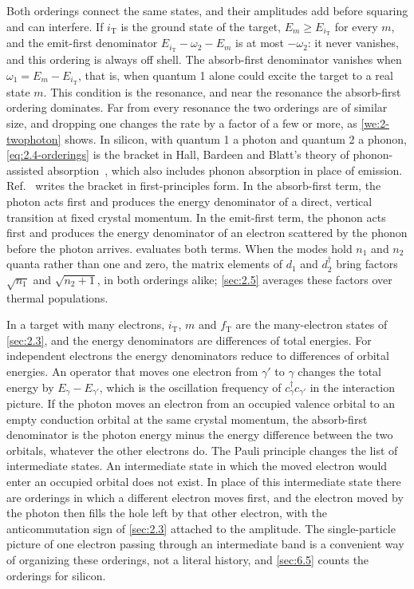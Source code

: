 Both orderings connect the same states, and their amplitudes add before squaring and can interfere. If $i_{\mathrm{T}}$ is the ground state of the target, $E_m \ge E_{i_{\mathrm{T}}}$ for every $m$, and the emit-first denominator $E_{i_{\mathrm{T}}} - \omega_2 - E_m$ is at most $-\omega_2$: it never vanishes, and this ordering is always off shell. The absorb-first denominator vanishes when $\omega_1 = E_m - E_{i_{\mathrm{T}}}$, that is, when quantum 1 alone could excite the target to a real state $m$. This condition is the resonance, and near the resonance the absorb-first ordering dominates. Far from every resonance the two orderings are of similar size, and dropping one changes the rate by a factor of a few or more, as \cref{we:2-twophoton} shows. In silicon, with quantum 1 a photon and quantum 2 a phonon, \cref{eq:2.4-orderings} is the bracket in Hall, Bardeen and Blatt's theory of phonon-assisted absorption~\cite{hall1954infrared}, which also includes phonon absorption in place of emission. Ref.~\cite[Eq.~(200)]{giustino2017electron} writes the bracket in first-principles form. In the absorb-first term, the photon acts first and produces the energy denominator of a direct, vertical transition at fixed crystal momentum. In the emit-first term, the phonon acts first and produces the energy denominator of an electron scattered by the phonon before the photon arrives.  evaluates both terms. When the modes hold $n_1$ and $n_2$ quanta rather than one and zero, the matrix elements of $d_1$ and $d_2^\dagger$ bring factors $\sqrt{n_1}$ and $\sqrt{n_2 + 1}$, in both orderings alike; \cref{sec:2.5} averages these factors over thermal populations.

In a target with many electrons, $i_{\mathrm{T}}$, $m$ and $f_{\mathrm{T}}$ are the many-electron states of \cref{sec:2.3}, and the energy denominators are differences of total energies. For independent electrons the energy denominators reduce to differences of orbital energies. An operator that moves one electron from $\gamma'$ to $\gamma$ changes the total energy by $E_\gamma - E_{\gamma'}$, which is the oscillation frequency of $c^\dagger_\gamma c_{\gamma'}$ in the interaction picture. If the photon moves an electron from an occupied valence orbital to an empty conduction orbital at the same crystal momentum, the absorb-first denominator is the photon energy minus the energy difference between the two orbitals, whatever the other electrons do. The Pauli principle changes the list of intermediate states. An intermediate state in which the moved electron would enter an occupied orbital does not exist. In place of this intermediate state there are orderings in which a different electron moves first, and the electron moved by the photon then fills the hole left by that other electron, with the anticommutation sign of \cref{sec:2.3} attached to the amplitude. The single-particle picture of one electron passing through an intermediate band is a convenient way of organizing these orderings, not a literal history, and \cref{sec:6.5} counts the orderings for silicon.

